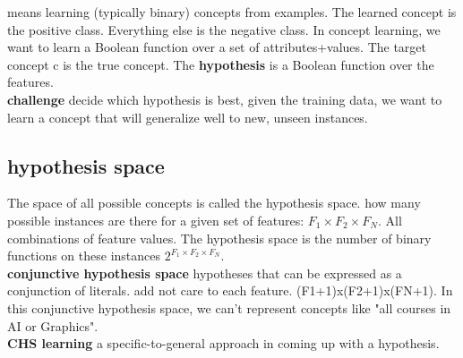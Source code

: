 \documentclass[cheatsheet.tex]{subfiles}
\begin{document}
means learning (typically binary) concepts from examples. The learned concept is the positive class. Everything else is the negative class. In concept learning, we want to learn a Boolean function over a set of attributes+values. The target concept c is the true concept. The \textbf{hypothesis} is a Boolean function over the features.
\\
\textbf{challenge} decide which hypothesis is best, given the training data, we want to learn a concept that will generalize well to new, unseen instances.
\subsection{hypothesis space}
The space of all possible concepts is called the hypothesis space. how many possible instances are there for a given set of features: $F_1 \times F_2 \times F_N$. All combinations of feature values. The hypothesis space is the number of binary functions on these instances $2^{F_1 \times F_2 \times F_N}$. 
\\
\textbf{conjunctive hypothesis space} hypotheses that can be expressed as a conjunction of literals. add not care to each feature. (F1+1)x(F2+1)x(FN+1). In this conjunctive hypothesis space, we can't represent concepts like "all courses in AI or Graphics". 
\\
\textbf{CHS learning} a specific-to-general approach in coming up with a hypothesis. 
\end{document}
